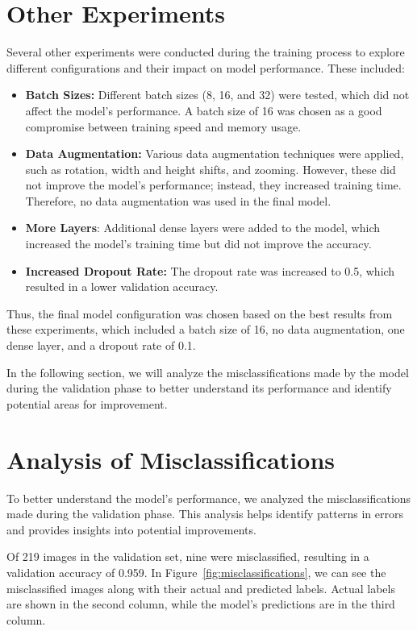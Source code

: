 \section{Other Experiments}

Several other experiments were conducted during the training process to explore different configurations and their impact on model performance. These included:

\begin{itemize}
    \item \textbf{Batch Sizes:} Different batch sizes (8, 16, and 32) were tested, which did not affect the model's performance. A batch size of 16 was chosen as a good compromise between training speed and memory usage.
    \item \textbf{Data Augmentation:} Various data augmentation techniques were applied, such as rotation, width and height shifts, and zooming. However, these did not improve the model's performance; instead, they increased training time. Therefore, no data augmentation was used in the final model.
    \item \textbf{More Layers}: Additional dense layers were added to the model, which increased the model's training time but did not improve the accuracy.
    \item \textbf{Increased Dropout Rate:} The dropout rate was increased to 0.5, which resulted in a lower validation accuracy.
\end{itemize}

Thus, the final model configuration was chosen based on the best results from these experiments, which included a batch size of 16, no data augmentation, one dense layer, and a dropout rate of 0.1.

In the following section, we will analyze the misclassifications made by the model during the validation phase to better understand its performance and identify potential areas for improvement.

\section{Analysis of Misclassifications}

To better understand the model's performance, we analyzed the misclassifications made during the validation phase. This analysis helps identify patterns in errors and provides insights into potential improvements.

Of 219 images in the validation set, nine were misclassified, resulting in a validation accuracy of 0.959. In Figure~\ref{fig:misclassifications}, we can see the misclassified images along with their actual and predicted labels. Actual labels are shown in the second column, while the model's predictions are in the third column.

